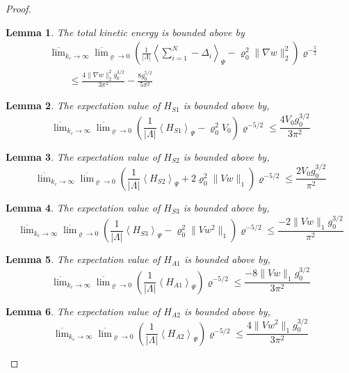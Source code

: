 \documentclass[11pt]{article}
\numberwithin{equation}{section}
\newcommand{\beq}{\begin{equation}}
\newcommand{\eeq}{\end{equation}}
\renewcommand\rho\varrho
\newtheorem{lem}{Lemma}[section]
\theoremstyle{definition}
\begin{document}
\begin{proof}
\begin{lem}\label{lemkinetic}The total kinetic energy is bounded  above by
\beq\label{proofthem1-1}
\begin{split}
&\overline\lim_{k_c\to\infty}\overline\lim_{\rho\to0}
\left(\frac{1}{|\Lambda|}\left\langle\sum_{i=1}^N-\Delta_i\right\rangle_{\Psi}-\rho_0^2 \|\nabla w\|_2^2\right)\rho^{-\frac{5}{2}}\\
&\qquad\leq \frac{4\|\nabla w\|_2^2g_0^{3/2}}{3\pi^2}  -\frac{8g_0^{5/2}}{5\pi^2}
\end{split}
\eeq
\end{lem}
\begin{lem}\label{lemHS1}
The expectation value of $H_{S1}$ is bounded  above by,
\beq\label{proofthem1-2}
\overline\lim_{k_c\to\infty}\overline\lim_{\rho\to0}
\left(\frac{1}{|\Lambda|}\left\langle H_{S1}\right\rangle_{\Psi}-\rho_0^2 V_0\right)\rho^{-5/2}
\leq \frac{4V_0g_0^{3/2}}{3\pi^2}
\eeq
\end{lem}
\begin{lem}\label{lemHS2}
The expectation value of $H_{S2}$ is bounded above by,
\beq\label{proofthem1-3}
\overline\lim_{k_c\to\infty}\overline\lim_{\rho\to0}
\left(\frac{1}{|\Lambda|}\left\langle H_{S2}\right\rangle_{\Psi}+2\rho_0^2 \|Vw\|_1\right)\rho^{-5/2}
\leq \frac{2V_0g_0^{3/2}}{\pi^2}
\eeq
\end{lem}
\begin{lem}\label{lemHS3}
The expectation value of $H_{S3}$ is bounded above by,
\beq\label{proofthem1-4}
\overline\lim_{k_c\to\infty}\overline\lim_{\rho\to0}
\left(\frac{1}{|\Lambda|}\left\langle H_{S3}\right\rangle_{\Psi}-\rho_0^2 \|Vw^2\|_1\right)\rho^{-5/2}
\leq \frac{-2\|Vw\|_1g_0^{3/2}}{\pi^2}
\eeq
\end{lem}
\begin{lem}\label{lemHAS1}
The expectation value of $H_{A1}$ is bounded above by,
\beq\label{proofthem1-5}
\overline\lim_{k_c\to\infty}\overline\lim_{\rho\to0}
\left(\frac{1}{|\Lambda|}\left\langle H_{A1}\right\rangle_{\Psi}\right)\rho^{-5/2}
\leq \frac{-8\|Vw\|_1g_0^{3/2}}{3\pi^2}
\eeq
\end{lem}
\begin{lem}\label{lemHAS2}
The expectation value of $H_{A2}$ is bounded above by,
\beq\label{proofthem1-6}
\overline\lim_{k_c\to\infty}\overline\lim_{\rho\to0}
\left(\frac{1}{|\Lambda|}\left\langle H_{A2}\right\rangle_{\Psi}\right)\rho^{-5/2}
\leq \frac{4\|Vw^2\|_1g_0^{3/2}}{3\pi^2}
\eeq
\end{lem}


\end{proof}
\end{document}
